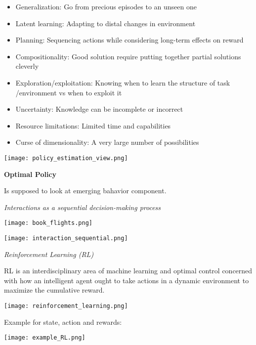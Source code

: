 \begin{itemize}[itemsep=-5pt, topsep=-20pt, leftmargin=*]
	\item Generalization: Go from precious episodes to an unseen one
	\item Latent learning: Adapting to distal changes in environment
	\item Planning: Sequencing actions while considering long-term effects on reward
	\item Compositionality: Good solution require putting together partial solutions cleverly
	\item Exploration/exploitation: Knowing when to learn the structure of task /environment vs when to exploit it
	\item Uncertainty: Knowledge can be incomplete or incorrect
	\item Resource limitations: Limited time and capabilities
	\item Curse of dimensionality: A very large number of possibilities
\end{itemize}

\begin{center}
	\texttt{[image: policy\_estimation\_view.png]}
\end{center}


\textbf{Optimal Policy}

Is supposed to look at emerging bahavior component. \medskip

\textit{Interactions as a sequential decision-making process} \smallskip

\begin{center}
	\texttt{[image: book\_flights.png]}
\end{center}

\begin{center}
	\texttt{[image: interaction\_sequential.png]}
\end{center}


\textit{Reinforcement Learning (RL)} \smallskip

RL is an interdisciplinary area of machine learning and optimal control concerned with how an intelligent agent ought to take actions in a dynamic environment to maximize the cumulative reward. 

\begin{center}
	\texttt{[image: reinforcement\_learning.png]}
\end{center}

Example for state, action and rewards: 
\begin{center}
	\texttt{[image: example\_RL.png]}
\end{center}

